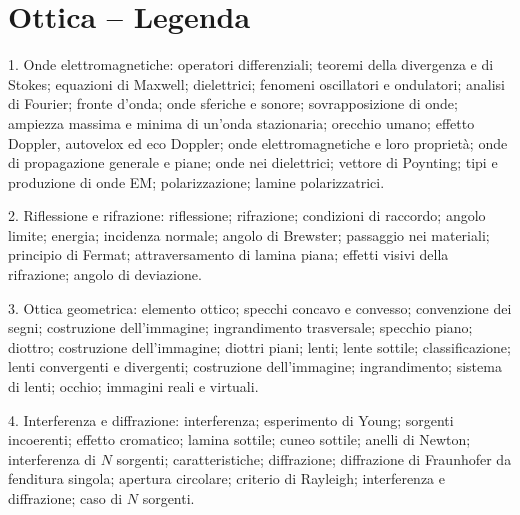 \documentclass[11pt,a4paper]{article}
\begin{document}
\section*{Ottica -- Legenda}
1. Onde elettromagnetiche: operatori differenziali; teoremi della divergenza e di Stokes; equazioni di Maxwell; dielettrici; fenomeni oscillatori e ondulatori; analisi di Fourier; fronte d'onda; onde sferiche e sonore; sovrapposizione di onde; ampiezza massima e minima di un'onda stazionaria; orecchio umano; effetto Doppler, autovelox ed eco Doppler; onde elettromagnetiche e loro proprietà; onde di propagazione generale e piane; onde nei dielettrici; vettore di Poynting; tipi e produzione di onde EM; polarizzazione; lamine polarizzatrici.

2. Riflessione e rifrazione: riflessione; rifrazione; condizioni di raccordo; angolo limite; energia; incidenza normale; angolo di Brewster; passaggio nei materiali; principio di Fermat; attraversamento di lamina piana; effetti visivi della rifrazione; angolo di deviazione.

3. Ottica geometrica: elemento ottico; specchi concavo e convesso; convenzione dei segni; costruzione dell'immagine; ingrandimento trasversale; specchio piano; diottro; costruzione dell'immagine; diottri piani; lenti; lente sottile; classificazione; lenti convergenti e divergenti; costruzione dell'immagine; ingrandimento; sistema di lenti; occhio; immagini reali e virtuali.

4. Interferenza e diffrazione: interferenza; esperimento di Young; sorgenti incoerenti; effetto cromatico; lamina sottile; cuneo sottile; anelli di Newton; interferenza di $N$ sorgenti; caratteristiche; diffrazione; diffrazione di Fraunhofer da fenditura singola; apertura circolare; criterio di Rayleigh; interferenza e diffrazione; caso di $N$ sorgenti.
\end{document}
